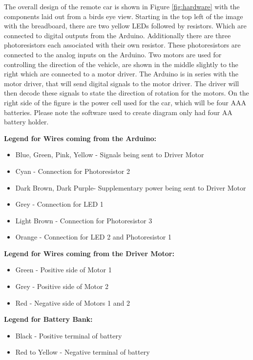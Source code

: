 \documentclass[letterpaper,12pt]{report}
\begin{document}
    The overall design of the remote car is shown in Figure \ref{fig:hardware}
    with the components laid out from a birds eye view. Starting in the top
    left of the image with the breadboard, there are two yellow LEDs followed by
    resistors. Which are connected to digital outputs from the Arduino.
    Additionally there are three photoresistors each associated with their own
    resistor. These photoresistors are connected to the analog inputs on the
    Arduino. Two motors are used for controlling the direction of the vehicle,
    are shown in the middle slightly to the right which are connected to a motor
    driver. The Arduino is in series with the motor driver, that will send
    digital signals to the motor driver. The driver will then decode these
    signals to state the direction of rotation for the motors. On the right side
    of the figure is the power cell used for the car, which will be four AAA
    batteries. Please note the software used to create diagram only had four AA
    battery holder.

    \textbf{Legend for Wires coming from the Arduino:}
    \begin{itemize}
        \item Blue, Green, Pink, Yellow - Signals being sent to Driver Motor
        \item Cyan - Connection for Photoresistor 2
        \item Dark Brown, Dark Purple- Supplementary power being sent to Driver Motor
        \item Grey - Connection for LED 1
        \item Light Brown - Connection for Photoresistor 3
        \item Orange - Connection for LED 2 and Photoresistor 1
    \end{itemize}

    \textbf{Legend for Wires coming from the Driver Motor:}
    \begin{itemize}
        \item Green - Positive side of Motor 1
        \item Grey - Positive side of Motor 2
        \item Red - Negative side of Motors 1 and 2
    \end{itemize}

    \textbf{Legend for Battery Bank:}
    \begin{itemize}
        \item Black - Positive terminal of battery
        \item Red to Yellow - Negative terminal of battery
    \end{itemize}
\end{document}

